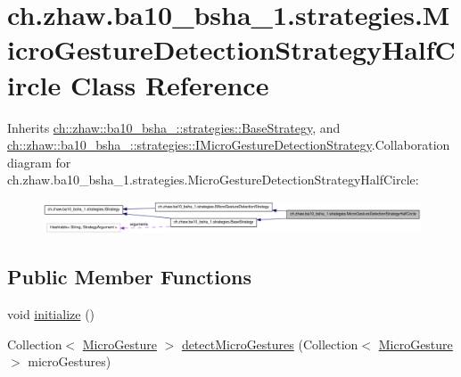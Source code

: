 \hypertarget{classch_1_1zhaw_1_1ba10__bsha__1_1_1strategies_1_1MicroGestureDetectionStrategyHalfCircle}{
\section{ch.zhaw.ba10\_\-bsha\_\-1.strategies.MicroGestureDetectionStrategyHalfCircle Class Reference}
\label{classch_1_1zhaw_1_1ba10__bsha__1_1_1strategies_1_1MicroGestureDetectionStrategyHalfCircle}
}


Inherits \hyperlink{classch_1_1zhaw_1_1ba10__bsha__1_1_1strategies_1_1BaseStrategy}{ch::zhaw::ba10\_\-bsha\_::strategies::BaseStrategy}, and \hyperlink{interfacech_1_1zhaw_1_1ba10__bsha__1_1_1strategies_1_1IMicroGestureDetectionStrategy}{ch::zhaw::ba10\_\-bsha\_::strategies::IMicroGestureDetectionStrategy}.Collaboration diagram for ch.zhaw.ba10\_\-bsha\_\-1.strategies.MicroGestureDetectionStrategyHalfCircle:\nopagebreak
\begin{figure}[H]
\begin{center}
\leavevmode
\includegraphics[width=400pt]{classch_1_1zhaw_1_1ba10__bsha__1_1_1strategies_1_1MicroGestureDetectionStrategyHalfCircle__coll__graph}
\end{center}
\end{figure}
\subsection*{Public Member Functions}
\begin{DoxyCompactItemize}
\item 
void \hyperlink{classch_1_1zhaw_1_1ba10__bsha__1_1_1strategies_1_1MicroGestureDetectionStrategyHalfCircle_a7f8d7d1b4c366aa2bcb4eade7db4af8f}{initialize} ()
\item 
Collection$<$ \hyperlink{classch_1_1zhaw_1_1ba10__bsha__1_1_1service_1_1MicroGesture}{MicroGesture} $>$ \hyperlink{classch_1_1zhaw_1_1ba10__bsha__1_1_1strategies_1_1MicroGestureDetectionStrategyHalfCircle_a780f7ded471f8e1dbd141518c41c060e}{detectMicroGestures} (Collection$<$ \hyperlink{classch_1_1zhaw_1_1ba10__bsha__1_1_1service_1_1MicroGesture}{MicroGesture} $>$ microGestures)
\end{DoxyCompactItemize}
